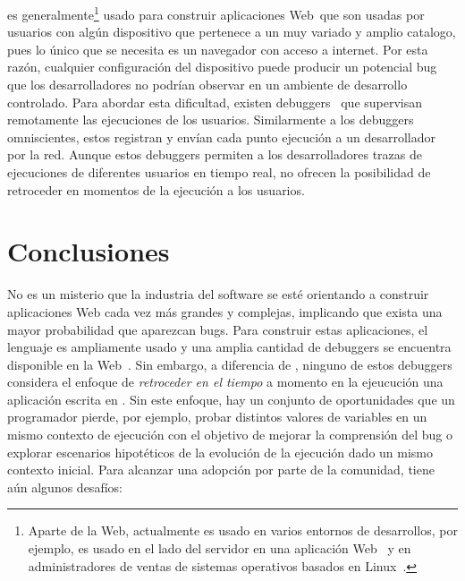 \documentclass[conference]{IEEEtran}
\begin{document}
\smallskip

 \javascript es generalmente\footnote{Aparte de la Web, \javascript actualmente es usado en varios entornos de desarrollos, por ejemplo, es usado en el lado del servidor en una aplicaci\'on Web~\cite{nodejs:2018} y en administradores de ventas de sistemas operativos basados en Linux~\cite{gjs}.} usado para construir aplicaciones Web\ que son usadas por usuarios con alg\'un dispositivo que pertenece a un muy variado y amplio catalogo, pues lo \'unico que se necesita es un navegador con acceso a internet. Por esta raz\'on, cualquier configuraci\'on del dispositivo puede producir un potencial bug que los desarrolladores no podr\'ian observar en un ambiente de desarrollo controlado. Para abordar esta dificultad, existen debuggers~\cite{sessionstack,raygun,trackjs} que supervisan remotamente las ejecuciones de los usuarios. Similarmente a los debuggers omniscientes, estos registran y env\'ian cada punto ejecuci\'on a un desarrollador por la red. Aunque estos debuggers permiten a los desarrolladores trazas de ejecuciones de diferentes usuarios en tiempo real, no ofrecen la posibilidad de retroceder en momentos de la ejecuci\'on a los usuarios.   

\section{Conclusiones}
\label{sec:conc}


No es un misterio que la industria del software se est\'e orientando a construir aplicaciones Web cada vez m\'as grandes y complejas, implicando que exista una mayor probabilidad que aparezcan bugs. Para construir estas aplicaciones, el lenguaje \javascript es ampliamente usado y una amplia cantidad de debuggers se encuentra disponible en la Web~\cite{bartonOdvarko:www2011,jsbin,nodejsInspector,sessionstack,raygun,trackjs,azar:2016,barrAl:fse2016}. Sin embargo, a diferencia de \deloreanjs, ninguno de estos debuggers considera el enfoque de {\em retroceder en el tiempo} a momento en la ejeucuci\'on una aplicaci\'on escrita en \javascript. Sin este enfoque, hay un conjunto de oportunidades que un programador pierde, por ejemplo, probar distintos valores de variables en un mismo contexto de ejecuci\'on con el objetivo de mejorar la comprensi\'on del bug o explorar escenarios hipot\'eticos de la evoluci\'on de la ejecuci\'on dado un mismo contexto inicial. Para alcanzar una adopci\'on por parte de la comunidad, \deloreanjs tiene a\'un algunos desaf\'ios:  
   
\end{document}
